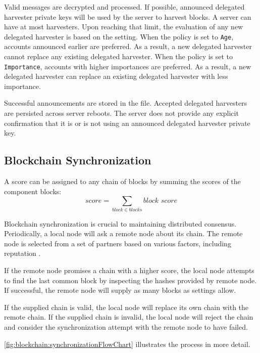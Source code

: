 Valid messages are decrypted and processed.
If possible, announced delegated harvester private keys will be used by the server to harvest blocks.
A server can have at most  harvesters.
Upon reaching that limit, the evaluation of any new delegated harvester is based on the  setting.
When the policy is set to \texttt{Age}, accounts announced earlier are preferred.
As a result, a new delegated harvester cannot replace any existing delegated harvester.
When the policy is set to \texttt{Importance}, accounts with higher importances are preferred.
As a result, a new delegated harvester can replace an existing delegated harvester with less importance.

Successful announcements are stored in the  file.
Accepted delegated harvesters are persisted across server reboots.
The server does not provide any explicit confirmation that it is or is not using an announced delegated harvester private key.

\subsection{Blockchain Synchronization}
\label{sec:blockchain:sync}

A score can be assigned to any chain of blocks by summing the scores of the component blocks:
\begin{equation}
\tag{blockchain score} \mathit{score} = \sum_{\mathit{block} \in \mathit{blocks}} \textit{block score}
\end{equation}

Blockchain synchronization is crucial to maintaining distributed consensus.
Periodically, a local node will ask a remote node about its chain.
The remote node is selected from a set of partners based on various factors, including reputation .

If the remote node promises a chain with a higher score, the local node attempts to find the last common block by inspecting the hashes provided by remote node.
If successful, the remote node will supply as many blocks as settings allow.

If the supplied chain is valid, the local node will replace its own chain with the remote chain.
If the supplied chain is invalid, the local node will reject the chain and consider the synchronization attempt with the remote node to have failed.

\autoref{fig:blockchain:synchronizationFlowChart} illustrates the process in more detail.

